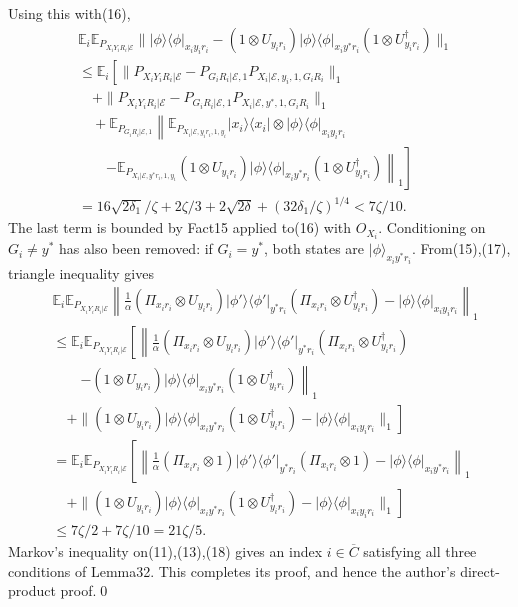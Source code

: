 \documentclass[10pt,a4paper]{article}
\providecommand{\ket}[1]{\lvert#1\rangle}
\providecommand{\bra}[1]{\langle#1\rvert}
\providecommand{\proj}[1]{\ket{#1}\bra{#1}}
\begin{document}
Using this with(16),
\begin{align*}&\mathbb E_i\mathbb E_{P_{X_iY_iR_i|\mathcal E}}\|\proj\phi_{x_iy_ir_i}-(1\otimes U_{y_ir_i})\proj\phi_{x_iy^*r_i}(1\otimes U_{y_ir_i}^\dagger)\|_1\\&\le\mathbb E_i\left[\|P_{X_iY_iR_i|\mathcal E}-P_{G_iR_i|\mathcal E,1}P_{X_i|\mathcal E,y_i,1,G_iR_i}\|_1\right.\\&\quad+\|P_{X_iY_iR_i|\mathcal E}-P_{G_iR_i|\mathcal E,1}P_{X_i|\mathcal E,y^*,1,G_iR_i}\|_1\\&\quad+\mathbb E_{P_{G_iR_i|\mathcal E,1}}\left\|\mathbb E_{P_{X_i|\mathcal E,y_ir_i,1,y_i}}\proj{x_i}\otimes\proj\phi_{x_iy_ir_i}\right.\\&\qquad\left.\left.-\mathbb E_{P_{X_i|\mathcal E,y^*r_i,1,y_i}}(1\otimes U_{y_ir_i})\proj\phi_{x_iy^*r_i}(1\otimes U_{y_ir_i}^\dagger)\right\|_1\right]\\&=16\sqrt{2\delta_1}/\zeta+2\zeta/3+2\sqrt{2\delta}+(32\delta_1/\zeta)^{1/4}<7\zeta/10.\tag{17}\end{align*}
The last term is bounded by Fact15 applied to(16) with $O_{X_i}$. Conditioning on $G_i\ne y^*$ has also been removed: if $G_i=y^*$, both states are $\ket\phi_{x_iy^*r_i}$.
From(15),(17), triangle inequality gives
\begin{align*}&\mathbb E_i\mathbb E_{P_{X_iY_iR_i|\mathcal E}}\left\|\frac1\alpha(\Pi_{x_ir_i}\otimes U_{y_ir_i})\proj{\phi'}_{y^*r_i}(\Pi_{x_ir_i}\otimes U_{y_ir_i}^\dagger)-\proj\phi_{x_iy_ir_i}\right\|_1\\&\le\mathbb E_i\mathbb E_{P_{X_iY_iR_i|\mathcal E}}\left[\left\|\frac1\alpha(\Pi_{x_ir_i}\otimes U_{y_ir_i})\proj{\phi'}_{y^*r_i}(\Pi_{x_ir_i}\otimes U_{y_ir_i}^\dagger)\right.\right.\\&\qquad\left.-(1\otimes U_{y_ir_i})\proj\phi_{x_iy^*r_i}(1\otimes U_{y_ir_i}^\dagger)\right\|_1\\&\quad\left.+\|(1\otimes U_{y_ir_i})\proj\phi_{x_iy^*r_i}(1\otimes U_{y_ir_i}^\dagger)-\proj\phi_{x_iy_ir_i}\|_1\right]\\&=\mathbb E_i\mathbb E_{P_{X_iY_iR_i|\mathcal E}}\left[\left\|\frac1\alpha(\Pi_{x_ir_i}\otimes1)\proj{\phi'}_{y^*r_i}(\Pi_{x_ir_i}\otimes1)-\proj\phi_{x_iy^*r_i}\right\|_1\right.\\&\quad\left.+\|(1\otimes U_{y_ir_i})\proj\phi_{x_iy^*r_i}(1\otimes U_{y_ir_i}^\dagger)-\proj\phi_{x_iy_ir_i}\|_1\right]\\&\le7\zeta/2+7\zeta/10=21\zeta/5.\tag{18}\end{align*}
Markov's inequality on(11),(13),(18) gives an index $i\in\overline C$ satisfying all three conditions of Lemma32. This completes its proof, and hence the author's direct-product proof.\qed
\end{document}
